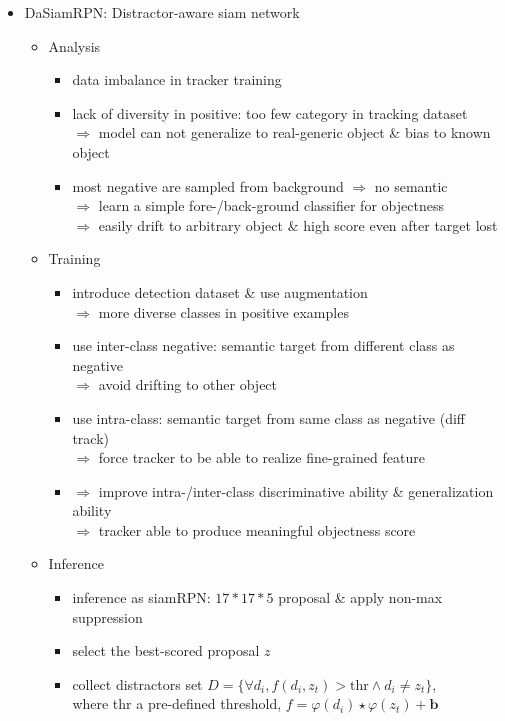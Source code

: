 \begin{itemize}
\item DaSiamRPN: Distractor-aware siam network
	\begin{itemize}
	\item Analysis
		\begin{itemize}
		\item data imbalance in tracker training
		\item lack of diversity in positive: too few category in tracking dataset \\
		$\Rightarrow$ model can not generalize to real-generic object \& bias to known object
		\item most negative are sampled from background $\Rightarrow$ no semantic \\
		$\Rightarrow$ learn a simple fore-/back-ground classifier for objectness \\
		$\Rightarrow$ easily drift to arbitrary object \& high score even after target lost
		\end{itemize}
	\item Training
		\begin{itemize}
		\item introduce detection dataset \& use augmentation \\
		$\Rightarrow$ more diverse classes in positive examples
		\item use inter-class negative: semantic target from different class as negative \\
		$\Rightarrow$ avoid drifting to other object
		\item use intra-class: semantic target from same class as negative (diff track) \\
		$\Rightarrow$ force tracker to be able to realize fine-grained feature
		\item $\Rightarrow$ improve intra-/inter-class discriminative ability \& generalization ability \\
		$\Rightarrow$ tracker able to produce meaningful objectness score
		\end{itemize}
	\item Inference
		\begin{itemize}
		\item inference as siamRPN: $17*17*5$ proposal \& apply non-max suppression
		\item select the best-scored proposal $z$
		\item collect distractors set $D = \{ \forall d_i,  f(d_i,z_t) > \text{thr} \wedge d_i \neq z_t \}$, \\
		where thr a pre-defined threshold, $f=\varphi(d_i)\star\varphi(z_t) +\mathbf b$

\end{itemize}
\end{itemize}
\end{itemize}
